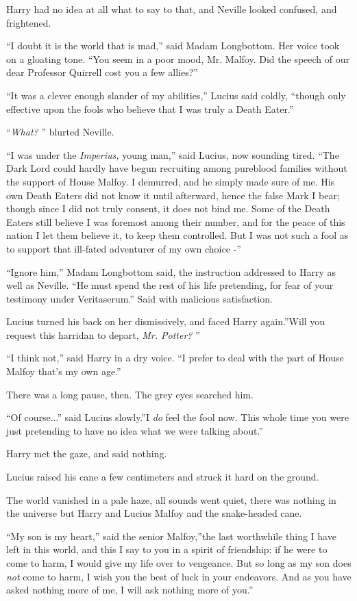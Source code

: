 Harry had no idea at all what to say to that, and Neville looked
confused, and frightened.

``I doubt it is the world that is mad,'' said Madam Longbottom. Her
voice took on a gloating tone. ``You seem in a poor mood, Mr. Malfoy.
Did the speech of our dear Professor Quirrell cost you a few allies?''

``It was a clever enough slander of my abilities,'' Lucius said coldly,
``though only effective upon the fools who believe that I was truly a
Death Eater.''

``\emph{What?} '' blurted Neville.

``I was under the \emph{Imperius,} young man,'' said Lucius, now sounding
tired. ``The Dark Lord could hardly have begun recruiting among
pureblood families without the support of House Malfoy. I demurred, and
he simply made sure of me. His own Death Eaters did not know it until
afterward, hence the false Mark I bear; though since I did not truly
consent, it does not bind me. Some of the Death Eaters still believe I
was foremost among their number, and for the peace of this nation I let
them believe it, to keep them controlled. But I was not such a fool as
to support that ill-fated adventurer of my own choice -''

``Ignore him,'' Madam Longbottom said, the instruction addressed to
Harry as well as Neville. ``He must spend the rest of his life
pretending, for fear of your testimony under Veritaserum.'' Said with
malicious satisfaction.

Lucius turned his back on her dismissively, and faced Harry again.''Will
you request this harridan to depart, \emph{Mr. Potter?} ''

``I think not,'' said Harry in a dry voice. ``I prefer to deal with the
part of House Malfoy that's my own age.''

There was a long pause, then. The grey eyes searched him.

``Of course...'' said Lucius slowly.''I \emph{do} feel the fool
now. This whole time you were just pretending to have no idea what we
were talking about.''

Harry met the gaze, and said nothing.

Lucius raised his cane a few centimeters and struck it hard on the
ground.

The world vanished in a pale haze, all sounds went quiet, there was
nothing in the universe but Harry and Lucius Malfoy and the snake-headed
cane.

``My son is my heart,'' said the senior Malfoy,''the last worthwhile
thing I have left in this world, and this I say to you in a spirit of
friendship: if he were to come to harm, I would give my life over to
vengeance. But so long as my son does \emph{not} come to harm, I wish
you the best of luck in your endeavors. And as you have asked nothing
more of me, I will ask nothing more of you.''

